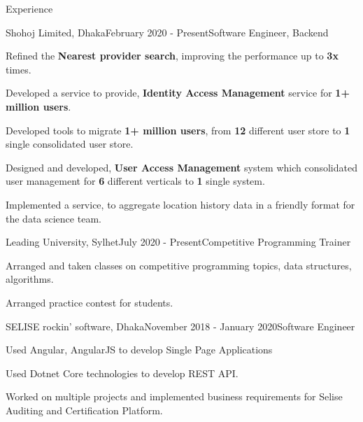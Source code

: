 \documentclass{resume}
\begin{document}
\begin{rSection}{Experience}

\begin{rSubsection}{Shohoj Limited, Dhaka}{February 2020 - Present}{Software Engineer, Backend}{}

\item Refined the \textbf{Nearest provider search}, improving the performance up to \textbf{3x} times.
\item Developed a service to provide, \textbf{Identity Access Management} service for \textbf{1+ million  users}.
\item Developed tools to migrate \textbf{1+ million users}, from \textbf{12} different user store to \textbf{1} single consolidated user store.
\item Designed and developed, \textbf{User Access Management} system which consolidated user management for \textbf{6} different verticals to \textbf{1} single system.
\item Implemented a service, to aggregate location history data in a friendly format for the data science team.
\end{rSubsection}

\begin{rSubsection}{Leading University, Sylhet}{July 2020 - Present}{Competitive Programming Trainer}{}
\item Arranged and taken classes on competitive programming topics, data structures, algorithms.
\item Arranged practice contest for students.
\end{rSubsection}

\begin{rSubsection}{SELISE rockin' software, Dhaka}{November 2018 - January 2020}{Software Engineer}{}
\item Used Angular, AngularJS to develop Single Page Applications
\item Used Dotnet Core technologies to develop REST API.
\item Worked on multiple projects and implemented business requirements for Selise Auditing and Certification Platform.
\end{rSubsection}

\end{rSection}

\end{document}
